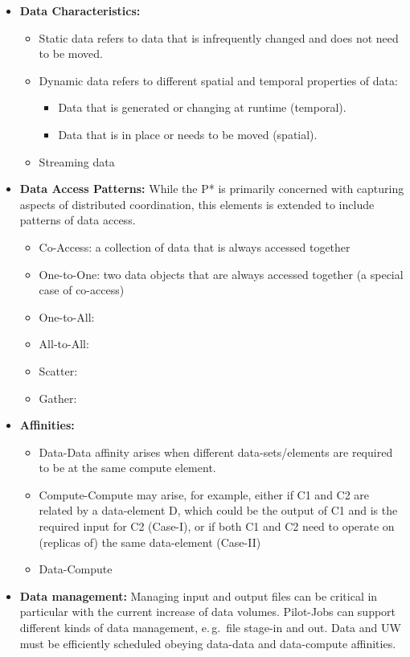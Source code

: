 \documentclass[conference,final]{IEEEtran}
\begin{document}
\begin{itemize}
    \item \textbf{Data Characteristics:}
    \begin{itemize}
    \item Static data refers to data that is infrequently changed and
does not need to be moved.
    \item Dynamic data refers to different spatial and temporal
properties of data:
    \begin{itemize}
    	\item Data that is generated or changing at runtime
(temporal).
    	\item Data that is in place or needs to be moved (spatial).
\end{itemize}
\item Streaming data
\end{itemize}  

\item \textbf{Data Access Patterns: } While the P* is primarily
concerned with capturing aspects of distributed coordination, this
elements is extended to include patterns of data access.
	\begin{itemize}
		\item Co-Access: a collection of data that is always
accessed together
		\item One-to-One: two data objects that are always
accessed together (a special case of co-access)
		\item One-to-All:
		\item All-to-All:
		\item Scatter:
		\item Gather:
	\end{itemize}

\item \textbf{Affinities:} 
\begin{itemize}
\item Data-Data affinity arises when different
data-sets/elements are required to be at the same compute element.
		\item Compute-Compute may arise, for example, either
if C1 and C2 are related by a data-element D, which could be the
output of C1 and is the required input for C2 (Case-I), or if both C1
and C2 need to operate on (replicas of) the same data-element
(Case-II)
\item Data-Compute
\end{itemize}
	\item \textbf{Data management:} Managing input and output
files can be critical in particular with the current increase of data
volumes.  Pilot-Jobs can support different kinds of data management,
e.\,g.\ file stage-in and out. Data and UW must be efficiently
scheduled obeying data-data and data-compute affinities.

\end{itemize}
\end{document}
